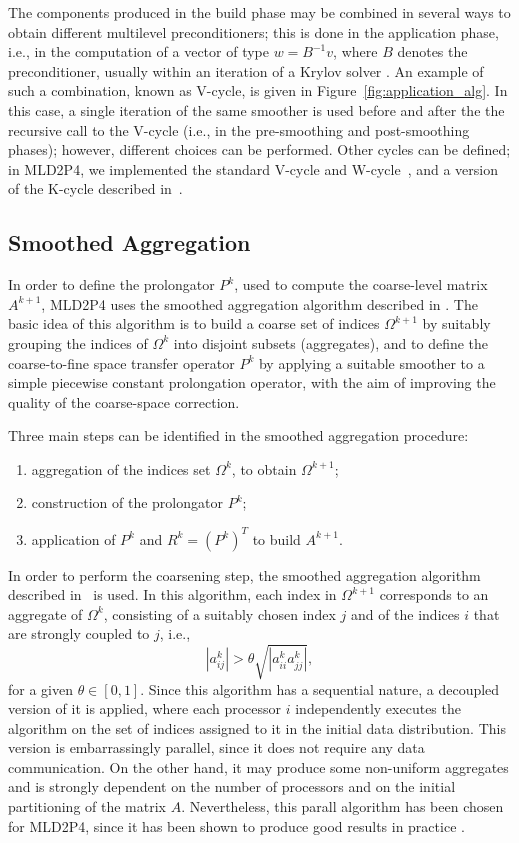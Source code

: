 The components produced in the build phase may be combined in several ways
to obtain different multilevel preconditioners;
this is  done in the application phase, i.e., in the computation of a vector
of type $w=B^{-1}v$, where $B$ denotes the preconditioner, usually within an iteration
of a Krylov solver \cite{Saad_book}. An example of such a combination, known as
V-cycle, is given in Figure~\ref{fig:application_alg}. In this case, a single iteration
of the same smoother is used before and after the the recursive call to the V-cycle (i.e.,
in the pre-smoothing and post-smoothing phases); however, different choices can be
performed. Other cycles can be defined; in MLD2P4, we implemented the standard V-cycle
and W-cycle~\cite{Briggs2000}, and a version of the K-cycle described in~\cite{Notay2008}. 


\subsection{Smoothed Aggregation\label{sec:aggregation}}

In order to define the prolongator $P^k$, used to compute
the coarse-level matrix $A^{k+1}$, MLD2P4 uses the smoothed aggregation
algorithm described in \cite{BREZINA_VANEK,VANEK_MANDEL_BREZINA}.
The basic idea of this algorithm is to build a coarse set of indices
$\Omega^{k+1}$ by suitably grouping the indices of $\Omega^k$ into disjoint
subsets (aggregates), and to define the coarse-to-fine space transfer operator
$P^k$ by applying a suitable smoother to a simple piecewise constant
prolongation operator, with the aim of improving the quality of the coarse-space correction.

Three main steps can be identified in the smoothed aggregation procedure:
\begin{enumerate}
        \item aggregation of the indices set $\Omega^k$, to obtain $\Omega^{k+1}$;
        \item construction of the prolongator $P^k$;
        \item application of $P^k$ and $R^k=(P^k)^T$ to build $A^{k+1}$.
\end{enumerate}
 
In order to perform the coarsening step, the smoothed aggregation algorithm
described in~\cite{VANEK_MANDEL_BREZINA} is used. In this algorithm,
each index in $\Omega^{k+1}$ corresponds to an aggregate of $\Omega^k$,
consisting of a suitably chosen index $j$ and of the indices $i$ that are strongly
coupled to $j$, i.e.,
 $$
    |a_{ij}^k| > \theta \sqrt{|a_{ii}^ka_{jj}^k|},
$$
for a given $\theta \in [0,1]$. Since this algorithm has a sequential nature, a decoupled
version of it is applied, where each processor $i$ independently executes
the algorithm on the set of indices assigned to it in the initial data
distribution. This version is embarrassingly parallel, since it does not require any data 
communication. On the other hand, it may produce some non-uniform aggregates
and is strongly dependent on the number of processors and on the initial partitioning
of the matrix $A$. Nevertheless, this parall algorithm has been chosen for
MLD2P4, since it has been shown to produce good results in practice
\cite{aaecc_07,apnum_07,TUMINARO_TONG}.

